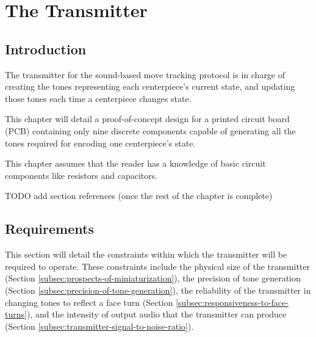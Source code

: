 
\chapter{The Transmitter} %
\label{Chapter6} 


\section{Introduction}
The transmitter for the sound-based move tracking protocol is in charge of creating the tones representing each centerpiece's current state, and updating those tones each time a centerpiece changes state.

This chapter will detail a proof-of-concept design for a printed circuit board (PCB) containing only nine discrete components capable of generating all the tones required for encoding one centerpiece's state.

This chapter assumes that the reader has a knowledge of basic circuit components like resistors and capacitors.

TODO add section references (once the rest of the chapter is complete)

\section{Requirements}
\label{sec:transmitter-requirements}
This section will detail the constraints within which the transmitter will be required to operate. These constraints include the physical size of the transmitter (Section \ref{subsec:prospects-of-miniaturization}), the precision of tone generation (Section \ref{subsec:precision-of-tone-generation}), the reliability of the transmitter in changing tones to reflect a face turn (Section \ref{subsec:responsiveness-to-face-turns}), and the intensity of output audio that the transmitter can produce (Section \ref{subsec:transmitter-signal-to-noise-ratio}).

